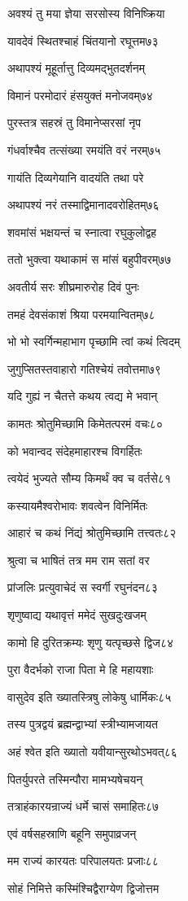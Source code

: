 अवश्यं तु मया ज्ञेया सरसोस्य विनिष्क्रिया

यावदेवं स्थितश्चाहं चिंतयानो रघूत्तम७३

अथापश्यं मूहूर्तात्तु दिव्यमद्भुतदर्शनम्

विमानं परमोदारं हंसयुक्तं मनोजवम्७४

पुरस्तत्र सहस्रं तु विमानेप्सरसां नृप

गंधर्वाश्चैव तत्संख्या रमयंति वरं नरम्७५

गायंति दिव्यगेयानि वादयंति तथा परे

अथापश्यं नरं तस्माद्विमानादवरोहितम्७६

शवमांसं भक्षयन्तं च स्नात्वा रघुकुलोद्वह

ततो भुक्त्वा यथाकामं स मांसं बहुपीवरम्७७

अवतीर्य सरः शीघ्रमारुरोह दिवं पुनः

तमहं देवसंकाशं श्रिया परमयान्वितम्७८

भो भो स्वर्गिन्महाभाग पृच्छामि त्वां कथं त्विदम्

जुगुप्सितस्तवाहारो गतिश्चेयं तवोत्तमा७९

यदि गुह्यं न चैतत्ते कथय त्वद्य मे भवान्

कामतः श्रोतुमिच्छामि किमेतत्परमं वचः८०

को भवान्वद संदेहमाहारश्च विगर्हितः

त्वयेदं भुज्यते सौम्य किमर्थं क्व च वर्तसे८१

कस्यायमैश्वरोभावः शवत्वेन विनिर्मितः

आहारं च कथं निंद्यं श्रोतुमिच्छामि तत्त्वतः८२

श्रुत्वा च भाषितं तत्र मम राम सतां वर

प्रांजलिः प्रत्युवाचेदं स स्वर्गी रघुनंदन८३

शृणुष्वाद्य यथावृत्तं ममेदं सुखदुःखजम्

कामो हि दुरितक्रम्यः शृणु यत्पृच्छसे द्विज८४

पुरा वैदर्भको राजा पिता मे हि महायशाः

वासुदेव इति ख्यातस्त्रिषु लोकेषु धार्मिकः८५

तस्य पुत्रद्वयं ब्रह्मन्द्वाभ्यां स्त्रीभ्यामजायत

अहं श्वेत इति ख्यातो यवीयान्सुरथोऽभवत्८६

पितर्युपरते तस्मिन्पौरा मामभ्यषेचयन्

तत्राहंकारयन्राज्यं धर्मे चासं समाहितः८७

एवं वर्षसहस्राणि बहूनि समुपाव्रजन्

मम राज्यं कारयतः परिपालयतः प्रजाः८८

सोहं निमित्ते कस्मिंश्चिद्वैराग्येण द्विजोत्तम

